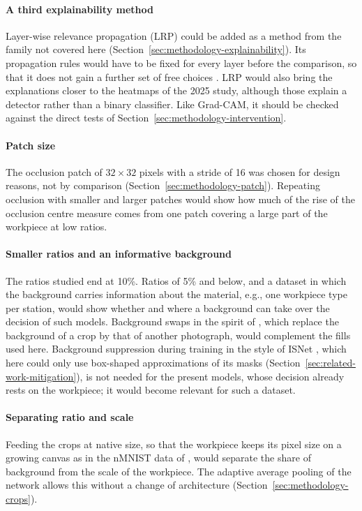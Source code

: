 \paragraph{A third explainability method}
Layer-wise relevance propagation (LRP) \citep{bach2015lrp} could be added as a method
from the family not covered here (Section~\ref{sec:methodology-explainability}). Its
propagation rules would have to be fixed for every layer before the comparison, so that
it does not gain a further set of free choices \citep{montavon2019lrp}. LRP would also
bring the explanations closer to the heatmaps of the 2025 study, although those explain
a detector rather than a binary classifier. Like Grad-CAM, it should be checked against
the direct tests of Section~\ref{sec:methodology-intervention}.

\paragraph{Patch size}
The occlusion patch of $32 \times 32$ pixels with a stride of 16 was chosen for design
reasons, not by comparison (Section~\ref{sec:methodology-patch}). Repeating occlusion
with smaller and larger patches would show how much of the rise of the occlusion centre
measure comes from one patch covering a large part of the workpiece at low ratios.

\paragraph{Smaller ratios and an informative background}
The ratios studied end at 10\%. Ratios of 5\% and below, and a dataset in which the
background carries information about the material, e.g., one workpiece type per station,
would show whether and where a background can take over the decision of such models.
Background swaps in the spirit of \citet{xiao2021noise}, which replace the
background of a crop by that of another photograph, would complement the fills used
here. Background suppression during training in the style of
ISNet \citep{bassi2024isnet}, which here could only use box-shaped approximations of its
masks (Section~\ref{sec:related-work-mitigation}), is not needed for the present models,
whose decision already rests on the workpiece; it would become relevant for such a
dataset.

\paragraph{Separating ratio and scale}
Feeding the crops at native size, so that the workpiece keeps its pixel size on a
growing canvas as in the nMNIST data of \citet{pawlowski2019needles},
would separate the share of background from the scale of the workpiece. The adaptive
average pooling of the network allows this without a change of architecture (Section~\ref{sec:methodology-crops}).

